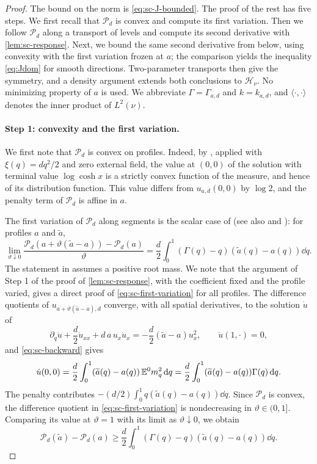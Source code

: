 \begin{proof}
The bound on the norm is \eqref{eq:sc-J-bounded}. The proof of the rest
has five steps. We first recall that $\mathcal P_d$ is convex and
compute its first variation. Then we follow $\mathcal P_d$ along a
transport of levels and compute its second derivative with
\cref{lem:sc-response}. Next, we bound the same second derivative from
below, using convexity with the first variation frozen at $a$; the
comparison yields the inequality \eqref{eq:Jdom} for smooth directions.
Two-parameter transports then give the symmetry, and a density argument
extends both conclusions to $\mathcal H_\nu$. No minimizing property of
$a$ is used. We abbreviate $\Gamma=\Gamma_{a,d}$ and $k=k_{a,d}$, and
$\langle\cdot,\cdot\rangle$ denotes the inner product of $L^2(\nu)$.

\paragraph{Step 1: convexity and the first variation.}
We first note that $\mathcal P_d$ is convex on profiles. Indeed, by
\cite[Theorem~2]{AuffingerChen2015Uniqueness}, applied with
$\xi(q)=dq^2/2$ and zero external field, the value at $(0,0)$ of the
solution with terminal value $\log\cosh x$ is a strictly convex
function of the measure, and hence of its distribution function. This
value differs from $u_{a,d}(0,0)$ by $\log2$, and the penalty term of
$\mathcal P_d$ is affine in $a$.

The first variation of $\mathcal P_d$ along segments is the scalar case of
\cite[(2.8)]{AL} (see also \cite[Lemma~3.2]{JagannathTobasco2017PhaseDiagram}
and \cite[Theorem~2]{Chen2017Variational}): for profiles $a$ and
$\widetilde a$,
\begin{equation}\label{eq:sc-first-variation}
 \lim_{\vartheta\downarrow0}\frac{\mathcal P_d(a+\vartheta(\widetilde a-a))
                               -\mathcal P_d(a)}{\vartheta}
 =\frac d2\int_0^1(\Gamma(q)-q)(\widetilde a(q)-a(q))\dd q .
\end{equation}
The statement in \cite{AL} assumes a positive root mass. We note
that the argument of Step 1 of the proof of \cref{lem:sc-response},
with the coefficient fixed and the profile varied, gives a direct proof
of \eqref{eq:sc-first-variation} for all profiles. The difference
quotients of
$u_{a+\vartheta(\widetilde a-a),d}$ converge, with all spatial
derivatives, to the solution $\dot u$ of
\[
 \partial_q\dot u+\frac d2\dot u_{xx}+d\,a\,u_x\dot u_x
 =-\frac d2(\widetilde a-a)u_x^2,\qquad \dot u(1,\cdot)=0,
\]
and \eqref{eq:sc-backward} gives
\[
 \dot u(0,0)=\frac d2\int_0^1(\widetilde a(q)-a(q))\,\mathbb E^0m_q^2\,\mathrm d q
 =\frac d2\int_0^1(\widetilde a(q)-a(q))\Gamma(q)\,\mathrm d q .
\]
The penalty contributes $-(d/2)\int_0^1q(\widetilde a(q)-a(q))\dd q$.
Since $\mathcal P_d$ is convex, the difference quotient in
\eqref{eq:sc-first-variation} is nondecreasing in $\vartheta\in(0,1]$.
Comparing its value at $\vartheta=1$ with its limit as
$\vartheta\downarrow0$, we obtain
\begin{equation}\label{eq:sc-convexity}
 \mathcal P_d(\widetilde a)-\mathcal P_d(a)
 \ge\frac d2\int_0^1(\Gamma(q)-q)(\widetilde a(q)-a(q))\dd q .
\end{equation}


\end{proof}
